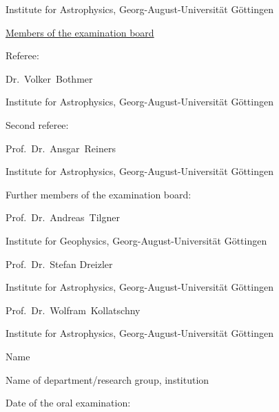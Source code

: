 Institute for Astrophysics, Georg-August-Universität Göttingen
% 
\vspace{3\baselineskip}

\noindent \underline{Members of the examination board}
\vspace{\baselineskip}

\noindent Referee:
\medskip

Dr.~Volker~Bothmer

Institute for Astrophysics, Georg-August-Universität Göttingen
\vspace{\baselineskip}

\noindent Second referee:
\medskip

Prof.~Dr.~Ansgar~Reiners

Institute for Astrophysics, Georg-August-Universität Göttingen
% 
% 
\vspace{\baselineskip}

\noindent Further members of the examination board:
\medskip

Prof.~Dr.~Andreas~Tilgner

Institute for Geophysics, Georg-August-Universität Göttingen
\vspace{\baselineskip}

Prof.~Dr.~Stefan Dreizler

Institute for Astrophysics, Georg-August-Universität Göttingen
\vspace{\baselineskip}

Prof.~Dr.~Wolfram~Kollatschny

Institute for Astrophysics, Georg-August-Universität Göttingen
\vspace{\baselineskip}

Name

Name of department/research group, institution
\vspace{3\baselineskip}

\noindent Date of the oral examination: \underline{\hspace{3cm}}


\cleardoublepage


